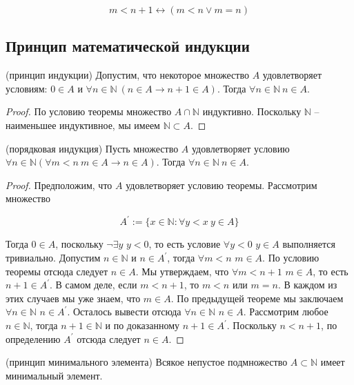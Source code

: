 {$$m<n+1 \leftrightarrow(m<n \vee m=n)$$

\subsection{Принцип математической индукции}

\begin{theorem}
(принцип индукции) Допустим, что некоторое множество $A$ удовлетворяет условиям: $0 \in A$ и $\forall n \in \mathbb{N} \ (n \in A \rightarrow n+1 \in A)$. Тогда $\forall n \in \mathbb{N} \ n \in A$.
\end{theorem}

\begin{proof}{По условию теоремы множество $A \cap \mathbb{N}$ индуктивно. Поскольку $\mathbb{N}$ -- наименьшее индуктивное, мы имеем $\mathbb{N} \subset A$.}
\end{proof}

\begin{theorem}
(порядковая индукция) Пусть множество $A$ удовлетворяет условию $\forall n \in \mathbb{N}(\forall m<n \ m \in A \rightarrow n \in A)$. Тогда $\forall n \in \mathbb{N} \ n \in A$.
\end{theorem}

\begin{proof}{Предположим, что $A$ удовлетворяет условию теоремы. Рассмотрим множество

$$A^{\prime}:=\{x \in \mathbb{N}: \forall y<x \ y \in A\}$$

Тогда $0 \in A$, поскольку $\neg \exists y$ $y<0$, то есть условие $\forall y<0$ $y \in A$ выполняется тривиально. Допустим $n \in \mathbb{N}$ и $n \in A^{\prime}$, тогда $\forall m<n$ $m \in A$. По условию теоремы отсюда следует $n \in A$. Мы утверждаем, что $\forall m < n + 1$ $m \in A$, то есть $n+1 \in A^\prime$. В самом деле, если $m < n + 1$, то $ m < n$ или $ m = n$. В каждом из этих случаев мы уже знаем, что $m \in A$. По предыдущей теореме мы заключаем $\forall n \in \mathbb{N}$ $n \in A^{\prime}$. Осталось вывести отсюда $\forall n \in \mathbb{N}$ $n \in A$. Рассмотрим любое $n \in \mathbb{N}$, тогда $n + 1 \in \mathbb{N}$ и по доказанному $n + 1 \in A^{\prime}$. Поскольку $n < n + 1$, по определению $A^\prime$ отсюда следует $n \in A$.}
\end{proof}

\begin{theorem}
(принцип минимального элемента) Всякое непустое подмножество $A \subset \mathbb{N}$ имеет минимальный элемент.
\end{theorem}

}
